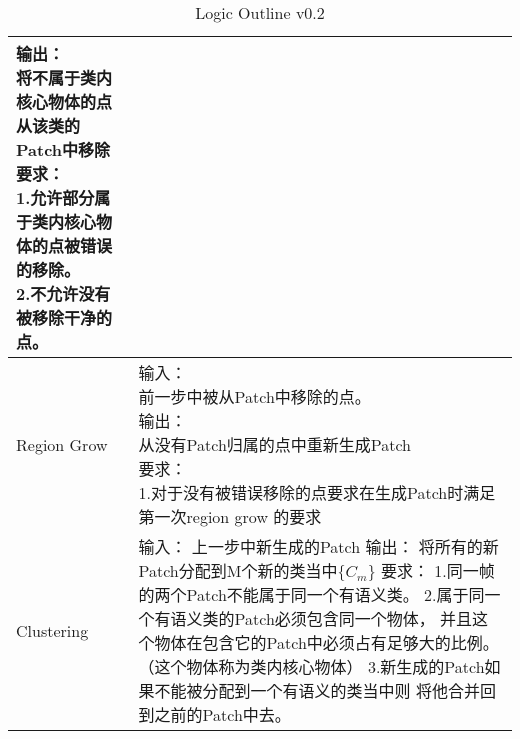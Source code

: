 \begin{table*}[!hbp]
\begin{tabular}{p{}|p{}}
{			输出：\\
			将不属于类内核心物体的点从该类的Patch中移除\\
			要求：\\
			1.允许部分属于类内核心物体的点被错误的移除。\\
			2.不允许没有被移除干净的点。}\\
		\hline
		Region Grow&\tabincell{l}{
			输入：\\
			前一步中被从Patch中移除的点。\\
			输出：\\
			从没有Patch归属的点中重新生成Patch\\
			要求：\\
			1.对于没有被错误移除的点要求在生成Patch时满足第一次region grow 的要求}\\
		\hline
		Clustering&\tabincell{l}{
			输入：\\
			上一步中新生成的Patch\\
			输出：\\
			将所有的新Patch分配到M个新的类当中$\{C_m\}$\\
			要求：\\
			1.同一帧的两个Patch不能属于同一个有语义类。\\
			2.属于同一个有语义类的Patch必须包含同一个物体，\\并且这个物体在包含它的Patch中必须占有足够大的比例。（这个物体称为类内核心物体）\\
			3.新生成的Patch如果不能被分配到一个有语义的类当中则\\将他合并回到之前的Patch中去。
			}\\
		\hline
	\end{tabular}
	\caption{Logic Outline v0.2} %
	\label{tab:logic_outline02}
\end{table*}